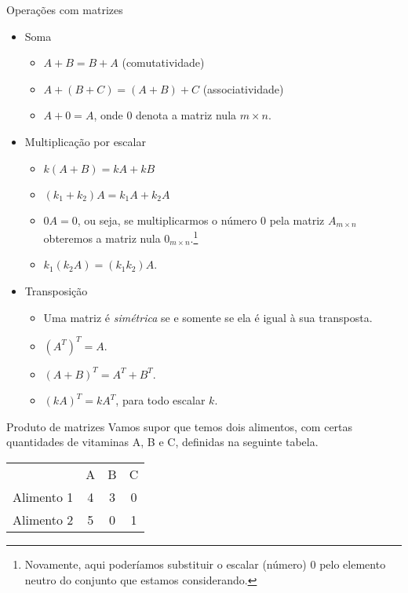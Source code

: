 \documentclass{beamer}
\begin{document}
\begin{darkframes}
\begin{frame}{Operações com matrizes}

\begin{itemize}
    \item<1-> Soma
    \begin{itemize}
        \item<2-4> $A+B=B+A$ (comutatividade)
        \item<3-4> $A+(B+C)=(A+B)+C$ (associatividade)
        \item<4-4> $A+0 = A$, onde $0$ denota a matriz nula $m\times n$.
    \end{itemize}
    \item<5-> Multiplicação por escalar
    \begin{itemize}
        \item<6-9> $k(A+B) = kA+kB$
        \item<7-9> $(k_1+k_2)A = k_1A+k_2A$
        \item<8-9> $0A = 0$, ou seja, se multiplicarmos o número $0$ pela matriz $A_{m\times n}$ obteremos a matriz nula $0_{m\times n}$.\footnote{Novamente, aqui poderíamos substituir o escalar (número) $0$ pelo elemento neutro do conjunto que estamos considerando.}
        \item<9-9> $k_1(k_2A) = (k_1k_2)A$.
    \end{itemize}
    \item<10-> Transposição
    \begin{itemize}
        \item<11-> Uma matriz é \emph{simétrica} se e somente se ela é igual à sua transposta.
        \item<12-> $\left(A^T\right)^T = A$.
        \item<13-> $(A+B)^T = A^T + B^T$.
        \item<14-> $(kA)^T = kA^T$, para todo escalar $k$.
    \end{itemize}
\end{itemize}
\end{frame}

\begin{frame}{Produto de matrizes}
Vamos supor que temos dois alimentos, com certas quantidades de vitaminas A, B e C, definidas na seguinte tabela.

\begin{center}
 \begin{tabular}{l c c c}
     & A & B & C\\
     Alimento 1 & 4 & 3 & 0\\
     Alimento 2 & 5 & 0 & 1
 \end{tabular}
\end{center}


\end{frame}
\end{darkframes}
\end{document}
